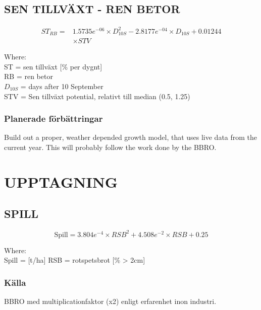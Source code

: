 \documentclass[fleqn]{article}
\begin{document}
  \subsection{SEN TILLVÄXT - REN BETOR}

    \begin{align}
      ST_{RB} = & 1.5735e^{-06} \times D^2_{10S} - 2.8177e^{-04} \times D_{10S} + 0.01244\\
      &\times {STV}
    \end{align}
    
    Where:\\
    \hangindent=1.5cm
    ST = sen tillväxt [\% per dygnt]\\
    RB = ren betor \\
    $D_{10S}$ = days after 10 September\\
    STV = Sen tillväxt potential, relativt till median (0.5, 1.25)

    \subsubsection{Planerade förbättringar}
    Build out a proper, weather depended growth model, that uses live data from the current year. This will probably follow the work done by the BBRO.


\pagebreak
\section{UPPTAGNING}

\subsection{SPILL}

  \begin{equation}
  \text{Spill} = 3.804e^{-4} \times RSB^2 + 4.508e^{-2} \times RSB + 0.25
  \end{equation}
  
  Where:\\
  \hangindent=1.5cm
  Spill = [t/ha]
  RSB = rotspetsbrot [\% > 2cm]\\
  
  \subsubsection{Källa}
  BBRO med multiplicationfaktor (x2) enligt erfarenhet inon industri.
  
\end{document}
